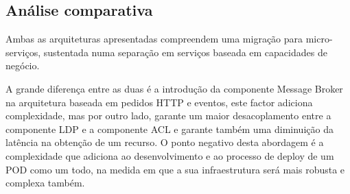 \subsection{Análise comparativa}
Ambas as arquiteturas apresentadas compreendem uma migração para micro-serviços, sustentada numa separação em serviços baseada em capacidades de negócio.

A grande diferença entre as duas é a introdução da componente Message Broker na arquitetura baseada em pedidos HTTP e eventos, este factor adiciona complexidade, mas por outro lado, garante um maior desacoplamento entre a componente LDP e a componente ACL e garante também uma diminuição da latência na obtenção de um recurso. O ponto negativo desta abordagem é a complexidade que adiciona ao desenvolvimento e ao processo de deploy de um POD como um todo, na medida em que a sua infraestrutura será mais robusta e complexa também.







